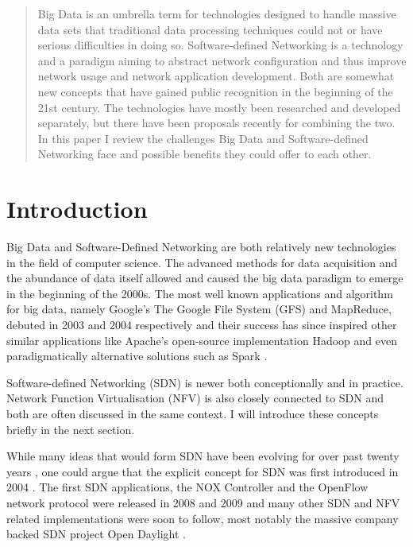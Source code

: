\documentclass{acm_proc_article-sp}
\begin{document}
\begin{abstract}

Big Data is an umbrella term for technologies designed to handle massive data sets that traditional  data processing techniques could not or have serious difficulties in doing so. Software-defined Networking is a technology and a paradigm aiming to abstract network configuration and thus improve network usage and network application development. Both are somewhat new concepts that have gained public recognition in the beginning of the 21st century. The technologies have mostly been researched and developed separately, but there have been proposals recently for combining the two. In this paper I review the challenges Big Data and Software-defined Networking face and possible benefits they could offer to each other.

\end{abstract}





\section{Introduction}
Big Data and Software-Defined Networking are both relatively new technologies in the field of computer science. The advanced methods for data acquisition and the abundance of data itself allowed and caused the big data paradigm to emerge in the beginning of the 2000s. The most well known applications and algorithm for big data, namely Google's The Google File System (GFS) and MapReduce, debuted in 2003 and 2004 respectively \cite{Ghemawat:2003:GFS:1165389.945450,Dean:2008:MSD:1327452.1327492} and their success has since inspired other similar applications like Apache's open-source implementation Hadoop \cite{Hadoop} and even paradigmatically alternative solutions such as Spark \cite{Spark}.

Software-defined Networking (SDN) is newer both conceptionally and in practice. Network Function Virtualisation (NFV) is also closely connected to SDN and both are often discussed in the same context. I will introduce these concepts briefly in the next section.

While many ideas that would form SDN have been evolving for over past twenty years \cite{Feamster:2013:RS:2559899.2560327}, one could argue that the explicit concept for SDN was first introduced in 2004 \cite{robert2012system}. The first SDN applications, the NOX Controller \cite{NOX} and the OpenFlow network protocol \cite{McKeown-CCR2008}  were released in 2008 and 2009 and many other SDN and NFV related implementations were soon to follow, most notably the massive company backed SDN project Open Daylight \cite{ODL}.
\end{document}
